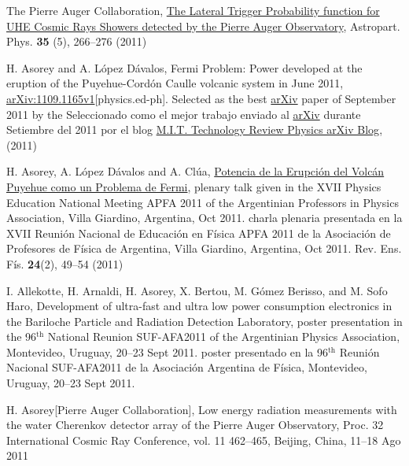 \begin{etaremune}
\item {} The Pierre Auger Collaboration, \href{http://dx.doi.org/10.1016/j.astropartphys.2011.08.001}{{The Lateral Trigger Probability function for UHE Cosmic Rays Showers detected by the Pierre Auger Observatory}}, Astropart. Phys. {\textbf{35}} (5), 266--276 (2011)

\item {}H. Asorey and A. López Dávalos, {{Fermi Problem: Power developed at the eruption of the Puyehue-Cordón Caulle volcanic system in June
2011}}, \href{http://arxiv.org/abs/1109.1165}{arXiv:1109.1165v1}[physics.ed-ph]. \ifeng Selected as the best \href{http://arxiv.org}{arXiv} paper of September 2011 by the \else Seleccionado como el mejor trabajo enviado al \href{http://arxiv.org}{arXiv} durante Setiembre del 2011 por el blog \fi \href{http://www.technologyreview.com/blog/arxiv/27140/}{M.I.T. Technology Review Physics arXiv Blog}, (2011)

\item {}H. Asorey, A. López Dávalos and A. Clúa, \href{https://dialnet.unirioja.es/servlet/articulo?codigo=4026852}{{Potencia de la Erupción del Volcán Puyehue como un Problema de Fermi}}, \ifeng plenary talk given in the XVII Physics Education National Meeting APFA 2011 of the Argentinian Professors in Physics Association, Villa Giardino, Argentina, Oct 2011. \else charla plenaria presentada en la XVII Reunión Nacional de Educación en Física APFA 2011 de la Asociación de Profesores de Física de Argentina, Villa Giardino, Argentina, Oct 2011. \fi Rev. Ens. Fís. {\textbf{24}}(2), 49--54 (2011)

\item {}I. Allekotte, H. Arnaldi, H. Asorey, X. Bertou, M. Gómez Berisso, and M. Sofo Haro, {{Development of ultra-fast and ultra low power consumption electronics in the Bariloche Particle and Radiation Detection Laboratory}},
\ifeng
poster presentation in the 96$^{\mathrm{th}}$ National Reunion SUF-AFA2011 of the Argentinian Physics Association, Montevideo, Uruguay, 20--23 Sept 2011.
\else
poster presentado en la 96$^{\mathrm{th}}$ Reunión Nacional SUF-AFA2011 de la Asociación Argentina de Física, Montevideo, Uruguay, 20--23 Sept 2011.
\fi

\item {}H. Asorey[Pierre Auger Collaboration], {{Low energy radiation
measurements with the water Cherenkov detector array of the Pierre Auger
Observatory}}, \en Proc.
32 International Cosmic Ray Conference, vol.
11
462--465, Beijing, China, 11--18 Ago 2011


\end{etaremune}
